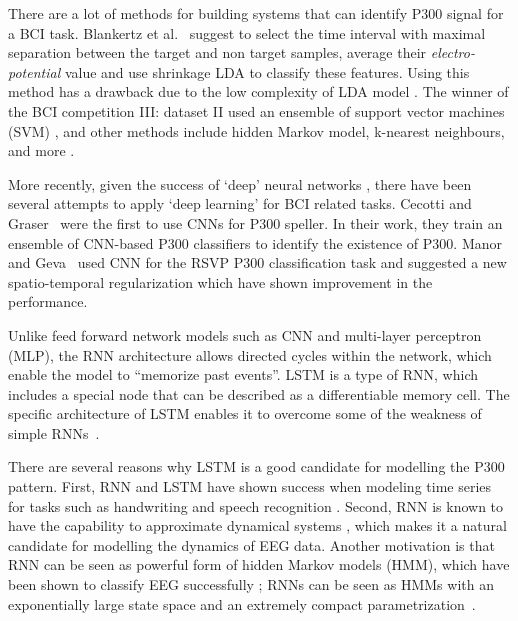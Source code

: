 \documentclass[
12pt, %
english, %
doublespacing, %
headsepline, %
]{MastersDoctoralThesis} %
\begin{document}
There are a lot of methods for building systems that can identify P300 signal for a BCI task. Blankertz et al.~\cite{P300_Tutorial} suggest to select the time interval with maximal separation between the target and non target samples, average their \textit{electro-potential} value and use shrinkage LDA to classify these features. Using this method has a drawback due to the low complexity of LDA model \cite{cincotti2003comparison}. The winner of the BCI competition III: dataset II used an ensemble of support vector machines (SVM) \cite{P300SVMWinner}, and other methods include hidden Markov model, k-nearest neighbours, and more  \cite{cincotti2003comparison}.

More recently, given the success of `deep' neural networks \cite{krizhevsky2012imagenet}, there have been several attempts to apply `deep learning' for BCI related tasks. Cecotti and Graser~\cite{P300_CNN} were the first to use CNNs  for P300 speller. In their work, they train an ensemble of CNN-based P300 classifiers to identify the existence of P300. Manor and Geva~\cite{RSVP_P300_geva} used CNN for the RSVP P300 classification task and suggested a new spatio-temporal regularization which have shown improvement in the performance.


Unlike feed forward network models such as CNN and multi-layer perceptron (MLP),  the RNN architecture allows directed cycles within the network, which enable the model to ``memorize past events''. LSTM \cite{LSTM_origin} is a type of RNN, which includes a special node that can be described as a differentiable memory cell. The specific architecture of LSTM enables it to overcome some of the weakness of simple RNNs~\cite{bengio1994learning}.

There are several reasons why LSTM is a good candidate for modelling the P300 pattern. First, RNN and LSTM have shown success when modeling time series for tasks such as handwriting and speech recognition \cite{graves2013speech,  graves2008unconstrained, yue2015beyond}. Second, RNN is known to have the capability to approximate dynamical systems \cite{li2005approximation}, which makes it a natural candidate for modelling the dynamics of EEG data. Another motivation is that RNN can be seen as powerful form of hidden Markov models (HMM), which have been shown to classify EEG successfully \cite{solhjoo2005classification,obermaier2001hidden,cincotti2003comparison}; RNNs can be seen as HMMs with an exponentially large state space and an extremely compact parametrization~\cite{sutskever2009recurrent}.
\end{document}
